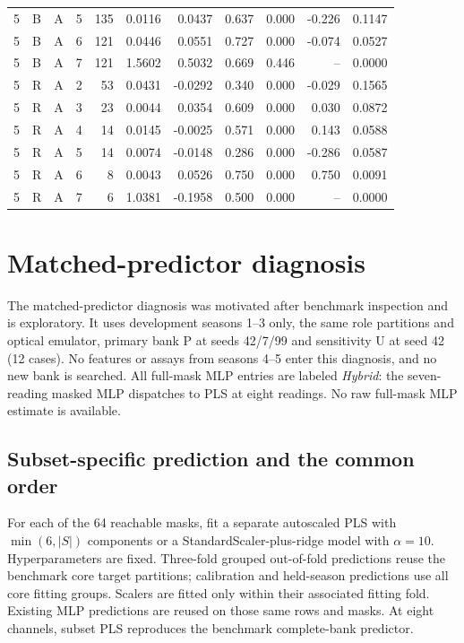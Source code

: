 \documentclass[10pt,a4paper]{article}
\begin{document}
\begin{longtable}{rllrrrrrrrr}
5 & B & A & 5 & 135 & 0.0116 & 0.0437 & 0.637 & 0.000 & -0.226 & 0.1147 \\
5 & B & A & 6 & 121 & 0.0446 & 0.0551 & 0.727 & 0.000 & -0.074 & 0.0527 \\
5 & B & A & 7 & 121 & 1.5602 & 0.5032 & 0.669 & 0.446 & -- & 0.0000 \\
5 & R & A & 2 & 53 & 0.0431 & -0.0292 & 0.340 & 0.000 & -0.029 & 0.1565 \\
5 & R & A & 3 & 23 & 0.0044 & 0.0354 & 0.609 & 0.000 & 0.030 & 0.0872 \\
5 & R & A & 4 & 14 & 0.0145 & -0.0025 & 0.571 & 0.000 & 0.143 & 0.0588 \\
5 & R & A & 5 & 14 & 0.0074 & -0.0148 & 0.286 & 0.000 & -0.286 & 0.0587 \\
5 & R & A & 6 & 8 & 0.0043 & 0.0526 & 0.750 & 0.000 & 0.750 & 0.0091 \\
5 & R & A & 7 & 6 & 1.0381 & -0.1958 & 0.500 & 0.000 & -- & 0.0000 \\
\end{longtable}
\endgroup

\section{Matched-predictor diagnosis}
The matched-predictor diagnosis was motivated after benchmark inspection and is exploratory. It uses development seasons 1--3 only, the same role partitions and optical emulator, primary bank P at seeds 42/7/99 and sensitivity U at seed 42 (12 cases). No features or assays from seasons 4--5 enter this diagnosis, and no new bank is searched. All full-mask MLP entries are labeled \emph{Hybrid}: the seven-reading masked MLP dispatches to PLS at eight readings. No raw full-mask MLP estimate is available.

\subsection{Subset-specific prediction and the common order}
For each of the 64 reachable masks, fit a separate autoscaled PLS with $\min(6,|S|)$ components or a StandardScaler-plus-ridge model with $\alpha=10$. Hyperparameters are fixed. Three-fold grouped out-of-fold predictions reuse the benchmark core target partitions; calibration and held-season predictions use all core fitting groups. Scalers are fitted only within their associated fitting fold. Existing MLP predictions are reused on those same rows and masks. At eight channels, subset PLS reproduces the benchmark complete-bank predictor.
\end{document}
